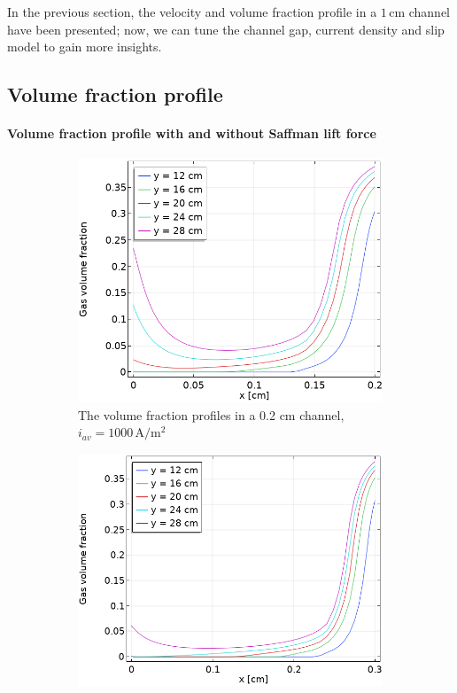 In the previous section, the velocity and volume fraction profile in a $1 \, \mathrm{cm}$ channel have been presented; now, we can tune the channel gap, current density and slip model to gain more insights.
\subsection{Volume fraction profile}

\paragraph{Volume fraction profile with and without Saffman lift force}
\*



\begin{figure}[H]
\centering
\begin{subfigure}{.5\textwidth}
  \centering
  \includegraphics[width=1\linewidth]{volumefraction2mm1000A.png}
  \caption{The volume fraction profiles in a 0.2 cm channel, $i_{av}=1000 \, \mathrm{A/m^2}$}
\end{subfigure}%
\begin{subfigure}{.5\textwidth}
  \centering
  \includegraphics[width=1\linewidth]{volumefraction3mm1000A.png}

\end{subfigure}
\end{figure}
